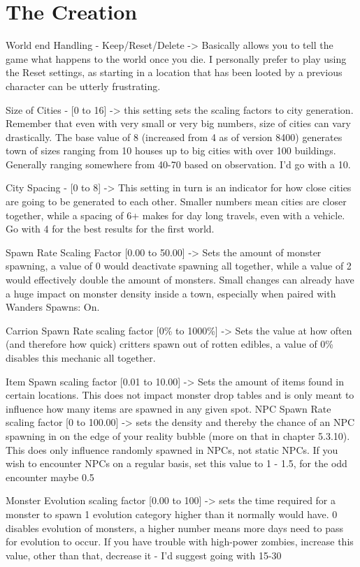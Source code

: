 \documentclass[11pt]{report}
\begin{document}
\section{The Creation}

World end Handling - Keep/Reset/Delete -> Basically allows you to tell the game what happens to the world once you die. I personally prefer to play using the Reset settings, as starting in a location that has been looted by a previous character can be utterly frustrating.

Size of Cities - [0 to 16] -> this setting sets the scaling factors to city generation. Remember that even with very small or very big numbers, size of cities can vary drastically. The base value of 8 (increased from 4 as of version 8400)  generates town of sizes ranging from 10 houses up to big cities with over 100 buildings. Generally ranging somewhere from 40-70 based on observation. I'd go with a 10.

City Spacing - [0 to 8] -> This setting in turn is an indicator for how close cities are going to be generated to each other. Smaller numbers mean cities are closer together, while a spacing of 6+ makes for day long travels, even with a vehicle. Go with 4 for the best results for the first world.

Spawn Rate Scaling Factor [0.00 to 50.00] -> Sets the amount of monster spawning, a value of 0 would deactivate spawning all together, while a value of 2 would effectively double the amount of monsters. Small changes can already have a huge impact on monster density inside a town, especially when paired with Wanders Spawns: On.

Carrion Spawn Rate scaling factor [0\% to 1000\%] -> Sets the value at how often (and therefore how quick) critters spawn out of rotten edibles, a value of 0\% disables this mechanic all together.

Item Spawn scaling factor [0.01 to 10.00] -> Sets the amount of items found in certain locations. This does not impact monster drop tables and is only meant to influence how many items are spawned in any given spot.
NPC Spawn Rate scaling factor [0 to 100.00] -> sets the density and thereby the chance of an NPC spawning in on the edge of your reality bubble (more on that in chapter 5.3.10). This does only influence randomly spawned in NPCs, not static NPCs. If you wish to encounter NPCs on a regular basis, set this value to 1 - 1.5, for the odd encounter maybe 0.5

Monster Evolution scaling factor [0.00 to 100] -> sets the time required for a monster to spawn 1 evolution category higher than it normally would have. 0 disables evolution of monsters, a higher number means more days need to pass for evolution to occur. If you have trouble with high-power zombies, increase this value, other than that, decrease it - I'd suggest going with 15-30
\end{document}
